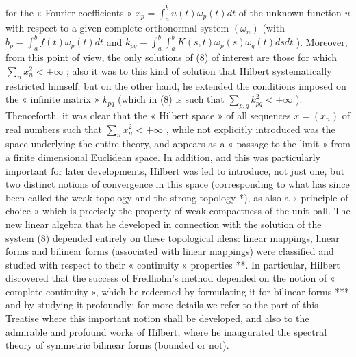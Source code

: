 for the « Fourier coefficients » \(x_{p} = \int_{a}^{b} u(t) \omega_{p}(t) dt\) of the unknown function \(u\) with respect to a given complete orthonormal system \((\omega_{n})\) (with \(b_{p} = \int_{a}^{b} f(t) \omega_{p}(t) dt\) and \(k_{pq} = \int_{a}^{b} \int_{a}^{b} K(s, t) \omega_{p}(s) \omega_{q}(t) ds dt\) ). Moreover, from this point of view, the only solutions of (8) of interest are those for which \(\sum_{n} x_{n}^{2} < +\infty\) ; also it was to this kind of solution that Hilbert systematically restricted himself; but on the other hand, he extended the conditions imposed on the « infinite matrix » \(k_{pq}\) (which in (8) is such that \(\sum_{p,q} k_{pq}^{2} < +\infty\) ). Thenceforth, it was clear that the « Hilbert space » of all sequences \(x = (x_{n})\) of real numbers such that \(\sum_{n} x_{n}^{2} < +\infty\) , while not explicitly introduced was the space underlying the entire theory, and appears as a « passage to the limit » from a finite dimensional Euclidean space. In addition, and this was particularly important for later developments, Hilbert was led to introduce, not just one, but two distinct notions of convergence in this space (corresponding to what has since been called the weak topology and the strong topology *), as also a « principle of choice » which is precisely the property of weak compactness of the unit ball. The new linear algebra that he developed in connection with the solution of the system (8) depended entirely on these topological ideas: linear mappings, linear forms and bilinear forms (associated with linear mappings) were classified and studied with respect to their « continuity » properties **. In particular, Hilbert discovered that the success of Fredholm's method depended on the notion of « complete continuity », which he redeemed by formulating it for bilinear forms *** and by studying it profoundly; for more details we refer to the part of this Treatise where this important notion shall be developed, and also to the admirable and profound works of Hilbert, where he inaugurated the spectral theory of symmetric bilinear forms (bounded or not).

